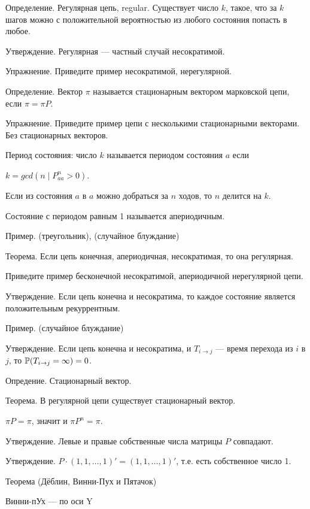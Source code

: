 Определение. Регулярная цепь, regular. Существует число $k$, такое, что за $k$ шагов можно с положительной вероятностью из любого состояния попасть в любое.

Утверждение. Регулярная --- частный случай несократимой. 

Упражнение. Приведите пример несократимой, нерегулярной.



Определение. Вектор $\pi$ называется стационарным вектором марковской цепи, если $\pi=\pi P$.

Упражнение. Приведите пример цепи с несколькими стационарными векторами. Без стационарных векторов.




Период состояния: число $k$ называется периодом состояния $a$ если 

$k=gcd(n\mid P^n_{aa}>0)$. 


Если из состояния $a$ в $a$ можно добраться за $n$ ходов, то $n$ делится на $k$.


Состояние с периодом равным 1 называется апериодичным. 


Пример. (треугольник), (случайное блуждание)



Теорема. Если цепь конечная, апериодичная, несократимая, то она регулярная.

Приведите пример бесконечной несократимой, апериодичной нерегулярной цепи.


Утверждение. Если цепь конечна и несократима, то каждое состояние является положительным рекуррентным.

Пример. (случайное блуждание)


Утверждение. Если цепь конечна и несократима, и $T_{i\to j}$ --- время перехода из $i$ в $j$, то $\P(T_{i\to j}=\infty)=0$.  


Опредение. Стационарный вектор. 


Теорема. В регулярной цепи существует стационарный вектор.


$\pi P=\pi$, значит и $\pi P^n=\pi$.




Утверждение. Левые и правые собственные числа матрицы $P$ совпадают.

Утверждение. $P\cdot (1,1,\ldots,1)'=(1,1,\ldots,1)'$, т.е. есть собственное число 1.


Теорема (Дёблин, Винни-Пух и Пятачок)

Винни-пУх --- по оси Y

